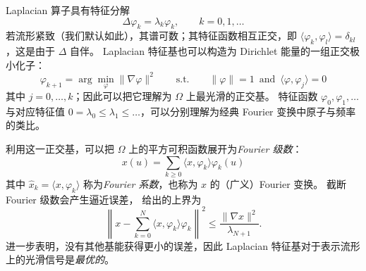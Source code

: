 Laplacian 算子具有特征分解%
$$
\Delta \varphi_k = \lambda_k \varphi_k, \quad\quad k=0, 1, \hdots 
$$
%
若流形紧致（我们默认如此），其谱可数；其特征函数相互正交，即 $\langle \varphi_k, \varphi_l \rangle = \delta_{kl}$，这是由于 $\Delta$ 自伴。
%
Laplacian 特征基也可以构造为 Dirichlet 能量的一组正交极小化子：
$$
\varphi_{k+1} = \arg\min_{\varphi} \| \nabla \varphi \|^2      \quad\quad \text{s.t.}\quad\quad   \|\varphi \|=1 \,\,\, \text{and} \,\,\, \langle \varphi, \varphi_{j} \rangle = 0 
$$
其中 $j=0,\hdots, k$；因此可以把它理解为 $\Omega$ 上最光滑的正交基。
%
特征函数 $\varphi_0, \varphi_1, \hdots$ 与对应特征值 $0 = \lambda_0 \leq \lambda_1 \leq \hdots $，可以分别理解为经典 Fourier 变换中原子与频率的类比。
%


利用这一正交基，可以把 $\Omega$ 上的平方可积函数展开为{\em Fourier 级数}：
$$
x (u) = \sum_{k \geq 0} \langle x, \varphi_k \rangle \varphi_k (u)
$$
%
其中 $\hat{x}_k = \langle x, \varphi_k \rangle$ 称为{\em Fourier 系数}，也称为 $x$ 的（广义）Fourier 变换。
%
截断 Fourier 级数会产生逼近误差，\citep{aflalo2013spectral} 给出的上界为
$$
\left\| x - \sum_{k = 0}^N \langle x, \varphi_k \rangle \varphi_k \right\|^2 \leq \frac{\| \nabla x\|^2}{\lambda_{N+1}}.
$$
\cite{aflalo2015optimality} 进一步表明，没有其他基能获得更小的误差，因此 Laplacian 特征基对于表示流形上的光滑信号是{\em 最优的}。


